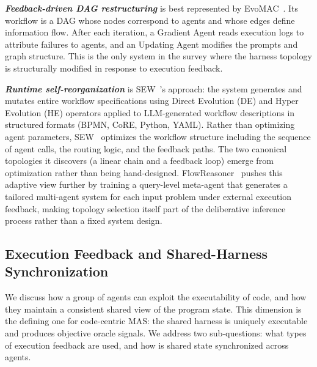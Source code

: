 \textbf{\textit{Feedback-driven DAG restructuring}} is best
represented by EvoMAC~\cite{Hu2025EvoMAC}. Its workflow is a DAG
whose nodes correspond to agents and whose edges define
information flow. After each iteration, a Gradient Agent reads
execution logs to attribute failures to agents, and an Updating
Agent modifies the prompts and graph structure. This is the only
system in the survey where the harness topology is structurally
modified in response to execution feedback.

\textbf{\textit{Runtime self-reorganization}} is
SEW~\cite{Liu2025SEW}'s approach: the system generates and mutates
entire workflow specifications using Direct Evolution (DE) and
Hyper Evolution (HE) operators applied to LLM-generated workflow
descriptions in structured formats (BPMN, CoRE, Python, YAML).
Rather than optimizing agent parameters, SEW~\cite{Liu2025SEW}
optimizes the workflow structure including the sequence of agent
calls, the routing logic, and the feedback paths. The two
canonical topologies it discovers (a linear chain and a feedback
loop) emerge from optimization rather than being hand-designed. FlowReasoner~\cite{gao2025flowreasoner} pushes this adaptive view
further by training a query-level meta-agent that generates a
tailored multi-agent system for each input problem under external
execution feedback, making topology selection itself part of the
deliberative inference process rather than a fixed system design.

\subsection{Execution Feedback and Shared-Harness Synchronization}

We discuss how a group of agents can exploit the executability of
code, and how they maintain a consistent shared view of the
program state.
This dimension is the defining one for code-centric MAS: the
shared harness is uniquely executable and produces objective
oracle signals. We address two sub-questions: what types of
execution feedback are used, and how is shared state
synchronized across agents.


